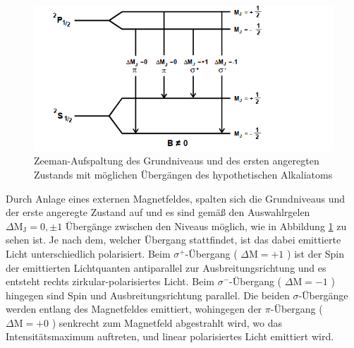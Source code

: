 \begin{figure}
  \centering
  \includegraphics[scale=0.4]{Aufspaltung3.png}
  \caption{Zeeman-Aufspaltung des Grundniveaus und des ersten angeregten Zustands mit möglichen Übergängen des hypothetischen Alkaliatoms\cite{Q1}}
  \label{abb:Aufspaltung2}
\end{figure}
\FloatBarrier
Durch Anlage eines externen Magnetfeldes, spalten sich die Grundniveaus und der erste angeregte Zustand auf und es sind gemäß den Auswahlrgelen $\Delta \text{M}_{\text{J}} = 0, \pm1$ Übergänge zwischen den Niveaus möglich, wie in Abbildung \ref{abb:Aufspaltung2} zu sehen ist.
Je nach dem, welcher Übergang stattfindet, ist das dabei emittierte Licht unterschiedlich polarisiert.
Beim $\sigma^+$-Übergang ( $\Delta \text{M} = +1$ ) ist der Spin der emittierten Lichtquanten antiparallel zur Ausbreitungsrichtung und es entsteht rechts zirkular-polarisiertes Licht. Beim $\sigma^-$-Übergang ( $\Delta \text{M} = -1$ ) hingegen sind Spin und Ausbreitungsrichtung parallel. Die beiden $\sigma$-Übergänge werden entlang des Magnetfeldes emittiert, wohingegen der $\pi$-Übergang ( $\Delta \text{M} = +0$ ) senkrecht zum Magnetfeld abgestrahlt wird, wo das Intensitätsmaximum auftreten, und linear polarisiertes Licht emittiert wird.
